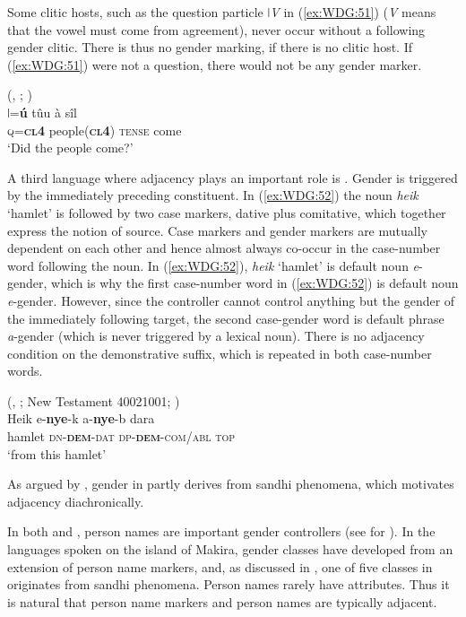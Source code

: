 \documentclass[output=collectionpaper]{langsci/langscibook}
\begin{document}
Some clitic hosts, such as the question particle \textit{ǀV} in (\ref{ex:WDG:51}) (\textit{V} means that the vowel must come from agreement), never occur without a following gender clitic. There is thus no gender marking, if there is no clitic host. If (\ref{ex:WDG:51}) were not a question, there would not be any gender marker.

\ea\label{ex:WDG:51}
 (, ; \citealt[18]{Traill1994})\\
\gll	ǀ=\textbf{ú}	tûu	à	sîl\\
	\textsc{q=\textbf{cl4}}	people(\textbf{\textsc{cl4}})	\textsc{tense}	come\\
\glt	`Did the people come?'\\
\z


A third language where adjacency plays an important role is . Gender is triggered by the immediately preceding constituent. In (\ref{ex:WDG:52}) the noun \textit{heik} `hamlet' is followed by two case markers, dative plus comitative, which together express the notion of source. Case markers and gender markers are mutually dependent on each other and hence almost always co-occur in the case-number word following the noun. In (\ref{ex:WDG:52}), \textit{heik} `hamlet' is default noun \textit{e}-gender, which is why the first case-number word in (\ref{ex:WDG:52}) is default noun \textit{e}-gender. However, since the controller cannot control anything but the gender of the immediately following target, the second case-gender word is default phrase \textit{a}-gender (which is never triggered by a lexical noun). There is no adjacency condition on the demonstrative suffix, which is repeated in both case-number words.

\ea\label{ex:WDG:52}
 (, ; New Testament 40021001; \citealt{Waelchli2018})\\
\gll Heik	e-\textbf{nye}-k	a-\textbf{nye}-b	dara\\
hamlet	\textsc{dn-\textbf{dem}-dat}	\textsc{dp-\textbf{dem}-com/abl}	\textsc{top}\\
\glt `from this hamlet'\\
\z

As argued by \cite{Waelchli2018}, gender in  partly derives from sandhi phenomena, which motivates adjacency diachronically.

In both  and , person names are important gender controllers (see  for ). In the  languages spoken on the island of Makira, gender classes have developed from an extension of person name markers, and, as discussed in , one of five classes in  originates from sandhi phenomena. Person names rarely have attributes. Thus it is natural that person name markers and person names are typically adjacent.
\end{document}
